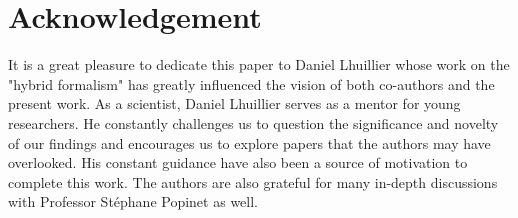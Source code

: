 \documentclass[11pt]{My_preprint}
\begin{document}
\section*{Acknowledgement}
It is a great pleasure to dedicate this paper to Daniel Lhuillier whose work on the "hybrid formalism" has greatly influenced the vision of both co-authors and the present work. 
As a scientist, Daniel Lhuillier serves as a mentor for young researchers. 
He constantly challenges us to question the significance and novelty of our findings and encourages us to explore papers that the authors may have overlooked.
His constant guidance have also been a source of motivation to complete this work.
The authors are also grateful for many in-depth discussions with Professor St\'ephane Popinet as well. 



\appendix







% 
% 
% 


\end{document}
